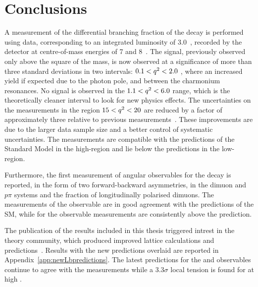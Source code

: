 \section{Conclusions}
  
  A measurement of the differential branching fraction of the
  \decay{\Lb}{\Lz\mumu} decay is performed using data, corresponding
  to an integrated luminosity of 3.0~\invfb, recorded by the \lhcb
  detector at centre-of-mass energies of 7 and 8~\tev. The signal, previously
  observed only above the square of the \psitwos mass, is now
  observed at a significance of more than three standard deviations in two \qsq intervals: $0.1 < {q^2} < 2.0$
  \gevgevcccc, where an increased yield if expected due to the photon pole, and between the charmonium
  resonances. No signal is observed in the $1.1 < {q^2} < 6.0$ \gevgevcccc range, which is the theoretically 
  cleaner interval to look for new physics effects. The uncertainties on the measurements in the
  region $15 < {q^2} < 20$ \gevgevcccc are reduced by a factor of
  approximately three relative to previous \lhcb
  measurements~\cite{LHCB-PAPER-2013-025}.  These improvements 
  are due to the larger data sample size and a better control of
  systematic uncertainties.  The measurements are compatible with the
  predictions of the Standard Model in the high-\qsq region and lie
  below the predictions in the low-\qsq region.

  Furthermore, the first measurement of angular observables for the
  \decay{\Lb}{\Lz\mumu} decay is reported, in the form of two
  forward-backward asymmetries, in the dimuon and $p\pi$ systems and
  the fraction of longitudinally polarised dimuons.  The measurements
  of the \afbh observable are in good agreement with the
  predictions of the SM, while for the \afbl observable
  measurements are consistently above the prediction.
  
  The publication of the results included in this thesis triggered intrest in the
  theory community, which produced improved lattice calculations and predictions~\cite{Detmold:2016pkz}.
  Results with the new predictions overlaid are reported in Appendix~\ref{app:newLbpredictions}.
  The latest predictions for the \fl and \afbh observables continue to agree with the
  measurements while a 3.3$\sigma$ local tension is found for \afbl at high \qsq.
  
  
  



